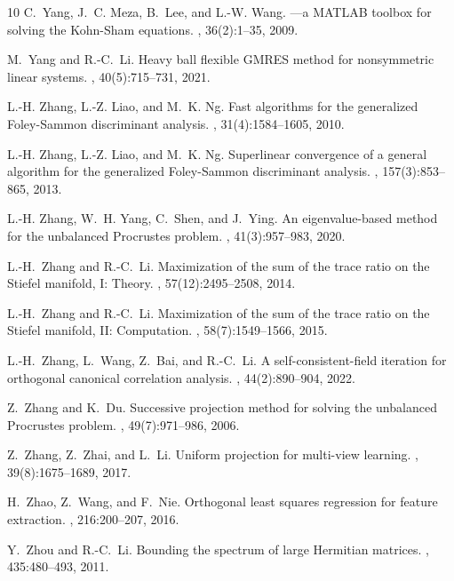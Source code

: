 \documentclass[11pt]{article}
\theoremstyle{definition}
\numberwithin{equation}{section}
\begin{document}
{\begin{thebibliography}{10}
C.~Yang, J.~C. Meza, B.~Lee, and L.-W. Wang.
---a {MATLAB} toolbox for solving the {Kohn-Sham} equations.
, 36(2):1--35, 2009.

M.~Yang and R.-C.~Li.
\newblock Heavy ball flexible {GMRES} method for nonsymmetric linear systems.
, 40(5):715--731, 2021.

L.-H. Zhang, L.-Z. Liao, and M.~K. Ng.
\newblock Fast algorithms for the generalized {Foley-Sammon} discriminant
  analysis.
, 31(4):1584--1605, 2010.

L.-H. Zhang, L.-Z. Liao, and M.~K. Ng.
\newblock Superlinear convergence of a general algorithm for the generalized
  {Foley-Sammon} discriminant analysis.
, 157(3):853--865, 2013.

L.-H. Zhang, W.~H. Yang, C.~Shen, and J.~Ying.
\newblock An eigenvalue-based method for the unbalanced {P}rocrustes problem.
, 41(3):957--983, 2020.

L.-H.~Zhang and R.-C.~Li.
\newblock Maximization of the sum of the trace ratio on the {Stiefel} manifold,
  {I}: Theory.
, 57(12):2495--2508, 2014.

L.-H.~Zhang and R.-C.~Li.
\newblock Maximization of the sum of the trace ratio on the {Stiefel} manifold,
  {II}: Computation.
, 58(7):1549--1566, 2015.

L.-H.~Zhang, L.~Wang, Z.~Bai, and R.-C.~Li.
\newblock A self-consistent-field iteration for orthogonal canonical
  correlation analysis.
, 44(2):890--904, 2022.

Z.~Zhang and K.~Du.
\newblock Successive projection method for solving the unbalanced {Procrustes}
  problem.
, 49(7):971--986, 2006.

Z.~Zhang, Z.~Zhai, and L.~Li.
\newblock Uniform projection for multi-view learning.
, 39(8):1675--1689,
  2017.

H.~Zhao, Z.~Wang, and F.~Nie.
\newblock Orthogonal least squares regression for feature extraction.
, 216:200--207, 2016.

Y.~Zhou and R.-C.~Li.
\newblock Bounding the spectrum of large {Hermitian} matrices.
, 435:480--493, 2011.

\end{thebibliography}
}
\end{document}

